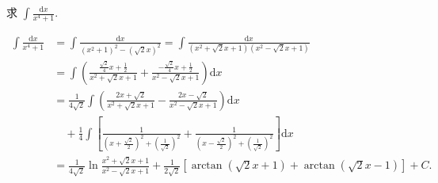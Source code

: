 \begin{example}\label{ex:5.3.7}
求 $\int\frac{\mathrm{d}x}{x^{4}+1}$.
\end{example}

\begin{solution}[解法 1]
\begin{align*}
\int\frac{\mathrm{d}x}{x^{4}+1}&=\int\frac{\mathrm{d}x}{(x^{2}+1)^{2}-(\sqrt{2}x)^{2}}
=\int\frac{\mathrm{d}x}{(x^{2}+\sqrt{2}x+1)(x^{2}-\sqrt{2}x+1)}\\
&=\int\left(\frac{\frac{\sqrt{2}}{4}x+\frac{1}{2}}{x^{2}+\sqrt{2}x+1}+\frac{-\frac{\sqrt{2}}{4}x+\frac{1}{2}}{x^{2}-\sqrt{2}x+1}\right)\mathrm{d}x\\
&=\frac{1}{4\sqrt{2}}\int\left(\frac{2x+\sqrt{2}}{x^{2}+\sqrt{2}x+1}-\frac{2x-\sqrt{2}}{x^{2}-\sqrt{2}x+1}\right)\mathrm{d}x\\
&\quad+\frac{1}{4}\int\left[\frac{1}{\left(x+\frac{\sqrt{2}}{2}\right)^{2}+\left(\frac{1}{\sqrt{2}}\right)^{2}}
+\frac{1}{\left(x-\frac{\sqrt{2}}{2}\right)^{2}+\left(\frac{1}{\sqrt{2}}\right)^{2}}\right]\mathrm{d}x\\
&=\frac{1}{4\sqrt{2}}\ln\frac{x^{2}+\sqrt{2}x+1}{x^{2}-\sqrt{2}x+1}
+\frac{1}{2\sqrt{2}}\left[\arctan(\sqrt{2}x+1)+\arctan(\sqrt{2}x-1)\right]+C.
\end{align*}
\end{solution}

